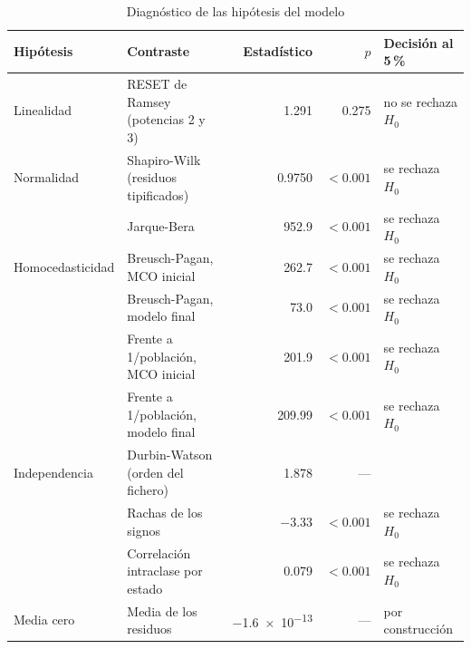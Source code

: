 \begin{table}[htbp]
\centering
\footnotesize
\caption{Diagnóstico de las hipótesis del modelo}\label{tab:diagnostico}
\begin{tabularx}{\linewidth}{l >{\raggedright\arraybackslash}X r r l}
\toprule
Hipótesis & Contraste & Estadístico & $p$ & Decisión al 5\,\% \\
\midrule
Linealidad & RESET de Ramsey (potencias 2 y 3) & \num{1.291} & \num{0.275} & no se rechaza $H_0$ \\
Normalidad & Shapiro-Wilk (residuos tipificados) & \num{0.9750} & $<\num{0.001}$ & se rechaza $H_0$ \\
 & Jarque-Bera & \num{952.9} & $<\num{0.001}$ & se rechaza $H_0$ \\
Homocedasticidad & Breusch-Pagan, MCO inicial & \num{262.7} & $<\num{0.001}$ & se rechaza $H_0$ \\
 & Breusch-Pagan, modelo final & \num{73.0} & $<\num{0.001}$ & se rechaza $H_0$ \\
 & Frente a 1/población, MCO inicial & \num{201.9} & $<\num{0.001}$ & se rechaza $H_0$ \\
 & Frente a 1/población, modelo final & \num{209.99} & $<\num{0.001}$ & se rechaza $H_0$ \\
Independencia & Durbin-Watson (orden del fichero) & \num{1.878} & --- & \\
 & Rachas de los signos & \num{-3.33} & $<\num{0.001}$ & se rechaza $H_0$ \\
 & Correlación intraclase por estado & \num{0.079} & $<\num{0.001}$ & se rechaza $H_0$ \\
Media cero & Media de los residuos & \num{-1.6e-13} & --- & por construcción \\
\bottomrule
\end{tabularx}
\par{}
\end{table}
